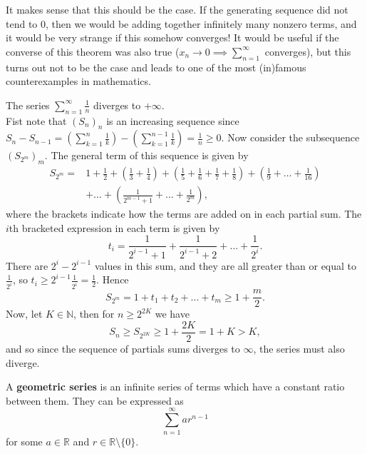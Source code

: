 \documentclass[../real_analysis.tex]{subfiles}
\begin{document}
        It makes sense that this should be the case. If the generating sequence did not tend to 0, then we would be adding together infinitely many nonzero terms, and it would be very strange if this somehow converges! It would be useful if the converse of this theorem was also true ($x_n\to0\implies\sum_{n=1}^\infty$ converges), but this turns out not to be the case and leads to one of the most (in)famous counterexamples in mathematics.
        \begin{example}
            The series $\sum_{n=1}^\infty\frac{1}{n}$ diverges to $+\infty$.\\
            Fist note that $(S_n)_n$ is an increasing sequence since $S_n-S_{n-1}=\left(\sum_{k=1}^n\frac{1}{k}\right)-\left(\sum_{k=1}^{n-1}\frac{1}{k}\right)=\frac{1}{n}\geq0$. Now consider the subsequence $(S_{2^m})_m$. The general term of this sequence is given by
            \begin{align}
                S_{2^m}=&1+\frac{1}{2}+\left(\frac{1}{3}+\frac{1}{4}\right)+\left(\frac{1}{5}+\frac{1}{6}+\frac{1}{7}+\frac{1}{8}\right)+\left(\frac{1}{9}+\dots+\frac{1}{16}\right)\\
                &+\dots+\left(\frac{1}{2^{m-1}+1}+\dots+\frac{1}{2^m}\right),
            \end{align}
            where the brackets indicate how the terms are added on in each partial sum. The $i$th bracketed expression in each term is given by
            \begin{equation}
                t_i=\frac{1}{2^{i-1}+1}+\frac{1}{2^{i-1}+2}+\dots+\frac{1}{2^i}.
            \end{equation}
            There are $2^i-2^{i-1}$ values in this sum, and they are all greater than or equal to $\frac{1}{2^i}$, so $t_i\geq2^{i-1}\frac{1}{2^i}=\frac{1}{2}$. Hence
            \begin{equation}
                S_{2^m}=1+t_1+t_2+\dots+t_m\geq1+\frac{m}{2}.
            \end{equation}
            Now, let $K\in\mathbb{N}$, then for $n\geq2^{2K}$ we have
            \begin{equation}
                S_n\geq S_{2^{2K}}\geq 1+\frac{2K}{2}=1+K>K,
            \end{equation}
            and so since the sequence of partials sums diverges to $\infty$, the series must also diverge.
        \end{example}
        \begin{definition}
            A \textbf{geometric series} is an infinite series of terms which have a constant ratio between them. They can be expressed as
            \begin{equation}
                \sum_{n=1}^\infty ar^{n-1}
            \end{equation}
            for some $a\in\mathbb{R}$ and $r\in\mathbb{R}\setminus\{0\}$.
        \end{definition}
\end{document}
